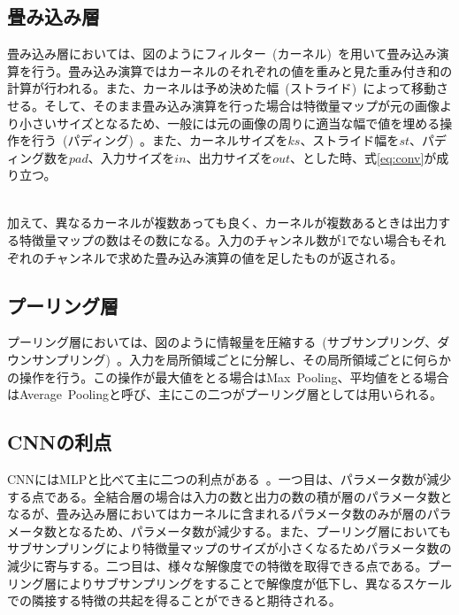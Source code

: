 \subsection{畳み込み層}

畳み込み層においては、図のようにフィルター~(カーネル)~を用いて畳み込み演算を行う。畳み込み演算ではカーネルのそれぞれの値を重みと見た重み付き和の計算が行われる。また、カーネルは予め決めた幅~(ストライド)~によって移動させる。そして、そのまま畳み込み演算を行った場合は特徴量マップが元の画像より小さいサイズとなるため、一般には元の画像の周りに適当な幅で値を埋める操作を行う~(パディング)~。また、カーネルサイズを$ks$、ストライド幅を$st$、パディング数を$pad$、入力サイズを$in$、出力サイズを$out$、とした時、式\ref{eq:conv}が成り立つ。

\begin{align}
    \label{eq:conv}
\end{align}

加えて、異なるカーネルが複数あっても良く、カーネルが複数あるときは出力する特徴量マップの数はその数になる。入力のチャンネル数が1でない場合もそれぞれのチャンネルで求めた畳み込み演算の値を足したものが返される。

\subsection{プーリング層}

プーリング層においては、図のように情報量を圧縮する~(サブサンプリング、ダウンサンプリング)~。入力を局所領域ごとに分解し、その局所領域ごとに何らかの操作を行う。この操作が最大値をとる場合はMax~Pooling、平均値をとる場合はAverage~Poolingと呼び、主にこの二つがプーリング層としては用いられる。

\subsection{CNNの利点}

CNNにはMLPと比べて主に二つの利点がある~\cite{CNNsurvey}。一つ目は、パラメータ数が減少する点である。全結合層の場合は入力の数と出力の数の積が層のパラメータ数となるが、畳み込み層においてはカーネルに含まれるパラメータ数のみが層のパラメータ数となるため、パラメータ数が減少する。また、プーリング層においてもサブサンプリングにより特徴量マップのサイズが小さくなるためパラメータ数の減少に寄与する。二つ目は、様々な解像度での特徴を取得できる点である。プーリング層によりサブサンプリングをすることで解像度が低下し、異なるスケールでの隣接する特徴の共起を得ることができると期待される。

